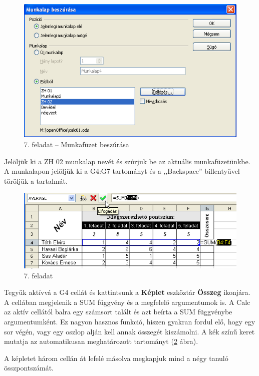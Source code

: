 \begin{figure}[!h]
\begin{center}
\includegraphics[width=11.235cm]{oocalcv1-img35.png}
\caption{7. feladat --  Munkafüzet beszúrása}\label{7-feladatMunkalap}
\end{center}
\end{figure}

Jelöljük ki a ZH 02 munkalap nevét és szúrjuk be az aktuális
munkafüzetünkbe.
A munkalapon jelöljük ki a G4:G7 tartományt és a
,,Backspace'' billentyűvel
töröljük a tartalmát. 

\begin{figure}[!h]
\begin{center}
\includegraphics[width=11.288cm]{oocalcv1-img36.png}
\caption{7. feladat}\label{7-feladat}
\end{center}
\end{figure}

Tegyük aktívvá a G4 cellát és kattintsunk a \textbf{Képlet}
eszköztár \textbf{Összeg} ikonjára. A cellában megjelenik a
SUM függvény és a megfelelő argumentumok is. A Calc az
aktív cellától balra egy számsort talált és azt beírta a
SUM függvénybe argumentumként. Ez nagyon hasznos funkció,
hiszen gyakran fordul elő, hogy egy sor végén, vagy egy oszlop
alján kell annak összegét kiszámolni. A kék színű keret
 mutatja az automatikusan meghatározott tartományt (\ref{7-feladat} ábra).

A képletet három cellán át lefelé másolva megkapjuk mind a
négy tanuló összpontszámát.


